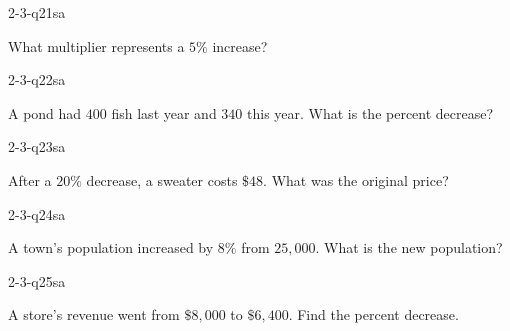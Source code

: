 \begin{practiceQuestion}{2-3-q21}{sa}
\begin{questionText}
What multiplier represents a $5\%$ increase?
\end{questionText}
\end{practiceQuestion}

\begin{practiceQuestion}{2-3-q22}{sa}
\begin{questionText}
A pond had $400$ fish last year and $340$ this year. What is the percent decrease?
\end{questionText}
\end{practiceQuestion}

\begin{practiceQuestion}{2-3-q23}{sa}
\begin{questionText}
After a $20\%$ decrease, a sweater costs $\$48$. What was the original price?
\end{questionText}
\end{practiceQuestion}

\begin{practiceQuestion}{2-3-q24}{sa}
\begin{questionText}
A town's population increased by $8\%$ from $25{,}000$. What is the new population?
\end{questionText}
\end{practiceQuestion}

\begin{practiceQuestion}{2-3-q25}{sa}
\begin{questionText}
A store's revenue went from $\$8{,}000$ to $\$6{,}400$. Find the percent decrease.
\end{questionText}
\end{practiceQuestion}


